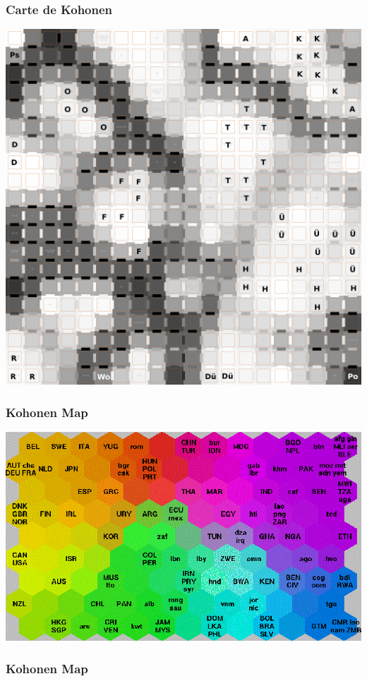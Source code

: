 \documentclass[11pt]{beamer}
\newenvironment{slide}[1]{%
\begin{frame}[environment=slide]
\frametitle{#1}
}{%
\end{frame}
}
\newcommand{\Pythonsmall}[1]{
	{\scriptsize }
}
\begin{document}
\begin{slide}{Carte de Kohonen}
\begin{center}
\includegraphics[scale=0.07]{HL_Kohonen.png}
\end{center}
\end{slide}


\begin{slide}{Kohonen Map}
\begin{center}
\includegraphics[scale=0.35]{povertymap}
\end{center}
\end{slide}

\begin{slide}{Kohonen Map}
\Pythonsmall{som1-extract}
\end{slide}
\end{document}
